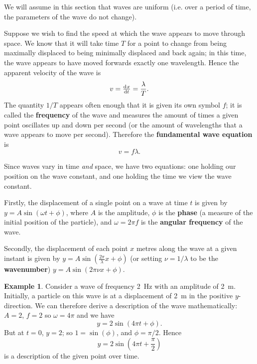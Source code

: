 \documentclass[a4paper]{amsbook}
\theoremstyle{definition}
\newtheorem*{example}{Example}
\numberwithin{exercise}{chapter}
\numberwithin{exercise}{chapter}
\begin{document}
We will assume in this section that waves are uniform (i.e. over a period of time, the parameters
of the wave do not change).

Suppose we wish to find the speed at which the wave appears to move through space.
We know that it will take time $ T $ for a point to change from being maximally displaced
to being minimally displaced and back again; in this time, the wave appears to have moved
forwards exactly one wavelength. Hence the apparent velocity of the wave is
\begin{displaymath}
  v = \od{x}{t} = \frac{\lambda}{T}.
\end{displaymath}
The quantity $ 1/T $ appears often enough that it is given its own symbol $ f $; it is
called the \textbf{frequency} of the wave and measures the amount of times a given point
oscillates up and down per second (or the amount of wavelengths that a wave appears
to move per second). Therefore the \textbf{fundamental wave equation} is
\begin{equation}
  v = f\lambda.
\end{equation}

Since waves vary in time \textit{and} space, we have two equations: one holding our position on
the wave constant, and one holding the time we view the wave constant.

Firstly, the displacement of a single point on a wave at time $ t $ is given by $ y = A\sin(\omega t + \phi) $,
where $ A $ is the amplitude, $ \phi $ is the \textbf{phase} (a measure of the initial position of the particle),
and $ \omega = 2\pi f $ is the \textbf{angular frequency} of the wave.

Secondly, the displacement of each point $ x $ metres along the wave at a given instant is given by $ y = A\sin(\frac{2\pi}{\lambda} x + \phi) $
(or setting $ \nu = 1/\lambda $ to be the \textbf{wavenumber}) $ y = A\sin(2\pi\nu x + \phi) $.

\begin{example}
  Consider a wave of frequency \SI{2}{\hertz} with an amplitude of \SI{2}{\metre}. Initially, a particle on
  this wave  is at a displacement of \SI{2}{\metre} in the positive $ y$-direction. We can therefore derive a description of the
  wave mathematically: $ A = 2 $, $ f = 2 $ so $ \omega = 4\pi $ and we have
  \begin{displaymath}
    y = 2 \sin(4\pi t + \phi).
  \end{displaymath}
  But at $ t = 0 $, $ y = 2 $; so $ 1 = \sin(\phi) $, and $ \phi = \pi/2 $. Hence
  \begin{displaymath}
    y = 2\sin\left(4\pi t + \frac{\pi}{2}\right)
  \end{displaymath}
  is a description of the given point over time.
\end{example}
\end{document}
